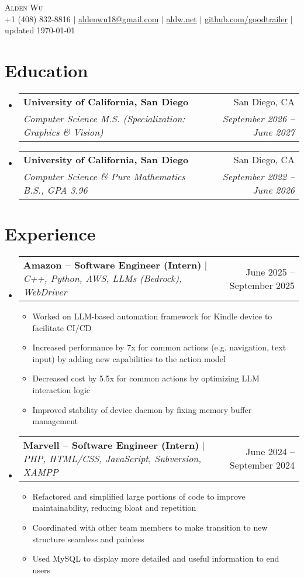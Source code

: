 \documentclass[letterpaper,11pt]{article}
\makeatletter
\newcommand{\resumeItem}[1]{
  \item\small{
    {#1 \vspace{-2pt}}
  }
}
\newcommand{\resumeSubheading}[4]{
  \vspace{-2pt}\item
    \begin{tabular*}{0.97\textwidth}[t]{l@{\extracolsep{\fill}}r}
      \textbf{#1} & #2 \\
      \textit{\small#3} & \textit{\small #4} \\
    \end{tabular*}\vspace{-7pt}
}
\newcommand{\resumeProjectHeading}[2]{
    \item
    \begin{tabular*}{0.97\textwidth}{l@{\extracolsep{\fill}}r}
      \small#1 & #2 \\
    \end{tabular*}\vspace{-7pt}
}
\newcommand{\resumeSubHeadingListStart}{\begin{itemize}[leftmargin=0.15in, label={}]}
\newcommand{\resumeSubHeadingListEnd}{\end{itemize}}
\newcommand{\resumeItemListStart}{\begin{itemize}}
\newcommand{\resumeItemListEnd}{\end{itemize}\vspace{-5pt}}
\makeatother
\begin{document}

\begin{center}
    {\huge \scshape Alden Wu} \\[0.2em]
    \small
    +1 (408) 832-8816 $\mid$
    \href{mailto:aldenwu18@gmail.com}{aldenwu18@gmail.com} $\mid$
    \href{https://aldw.net}{aldw.net} $\mid$
    \href{https://github.com/goodtrailer}{github.com/goodtrailer} $\mid$
    updated \today
\end{center}

\section{Education}
    \resumeSubHeadingListStart
        \resumeSubheading
            {University of California, San Diego}{San Diego, CA}
            {Computer Science M.S. (Specialization: Graphics \& Vision)}{September 2026 -- June 2027}
        \resumeSubheading
            {University of California, San Diego}{San Diego, CA}
            {Computer Science \& Pure Mathematics B.S., GPA 3.96}{September 2022 -- June 2026}
    \resumeSubHeadingListEnd

\section{Experience}
    \resumeSubHeadingListStart
        \resumeProjectHeading
            {\textbf{Amazon -- Software Engineer (Intern)} $\mid$ \emph{C++, Python, AWS, LLMs (Bedrock), WebDriver}}{June 2025 -- September 2025}
            \resumeItemListStart
                \resumeItem{Worked on LLM-based automation framework for Kindle device to facilitate CI/CD}
                \resumeItem{Increased performance by 7x for common actions (e.g. navigation, text input) by adding new capabilities to the action model}
                \resumeItem{Decreased cost by 5.5x for common actions by optimizing LLM interaction logic}
                \resumeItem{Improved stability of device daemon by fixing memory buffer management}
            \resumeItemListEnd
        \resumeProjectHeading
            {\textbf{Marvell -- Software Engineer (Intern)} $\mid$ \emph{PHP, HTML/CSS, JavaScript, Subversion, XAMPP}}{June 2024 -- September 2024}
            \resumeItemListStart
                \resumeItem{Refactored and simplified large portions of code to improve maintainability, reducing bloat and repetition}
                \resumeItem{Coordinated with other team members to make transition to new structure seamless and painless}
                \resumeItem{Used MySQL to display more detailed and useful information to end users}
            \resumeItemListEnd
    \resumeSubHeadingListEnd
\end{document}
